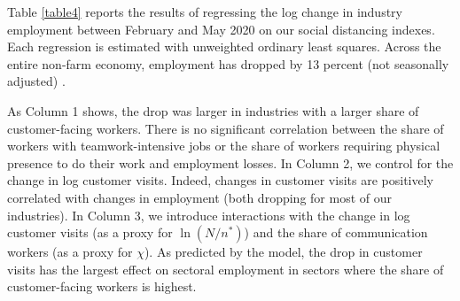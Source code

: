 \documentclass[10pt,letterpaper]{article}
\begin{document}
Table \ref{table4} reports the results of regressing the log change in industry employment between February and May 2020 on our social distancing indexes. Each regression is estimated with unweighted ordinary least squares. Across the entire non-farm economy, employment has dropped by 13 percent (not seasonally adjusted) \cite{CES}. 

As Column 1 shows, the drop was larger in industries with a larger share of customer-facing workers. There is no significant correlation between the share of workers with teamwork-intensive jobs or the share of workers requiring physical presence to do their work and employment losses. In Column 2, we control for the change in log customer visits. Indeed, changes in customer visits are positively correlated with changes in employment (both dropping for most of our industries).  In Column 3, we introduce interactions with the change in log customer visits (as a proxy for $\ln (N/n^*)$) and the share of communication workers (as a proxy for $\chi$). As predicted by the model, the drop in customer visits has the largest effect on sectoral employment in sectors where the share of customer-facing workers is highest.
 
\end{document}
